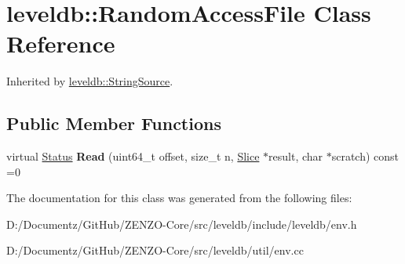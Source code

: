 \hypertarget{classleveldb_1_1_random_access_file}{}\section{leveldb\+::Random\+Access\+File Class Reference}
\label{classleveldb_1_1_random_access_file}


Inherited by \mbox{\hyperlink{classleveldb_1_1_string_source}{leveldb\+::\+String\+Source}}.

\subsection*{Public Member Functions}
\begin{DoxyCompactItemize}
\item 
\mbox{\label{classleveldb_1_1_random_access_file_a1a09fadcec904d9791a968acabca98d0}} 
virtual \mbox{\hyperlink{classleveldb_1_1_status}{Status}} {\bfseries Read} (uint64\+\_\+t offset, size\+\_\+t n, \mbox{\hyperlink{classleveldb_1_1_slice}{Slice}} $\ast$result, char $\ast$scratch) const =0
\end{DoxyCompactItemize}


The documentation for this class was generated from the following files\+:\begin{DoxyCompactItemize}
\item 
D\+:/\+Documentz/\+Git\+Hub/\+Z\+E\+N\+Z\+O-\/\+Core/src/leveldb/include/leveldb/env.\+h\item 
D\+:/\+Documentz/\+Git\+Hub/\+Z\+E\+N\+Z\+O-\/\+Core/src/leveldb/util/env.\+cc\end{DoxyCompactItemize}
